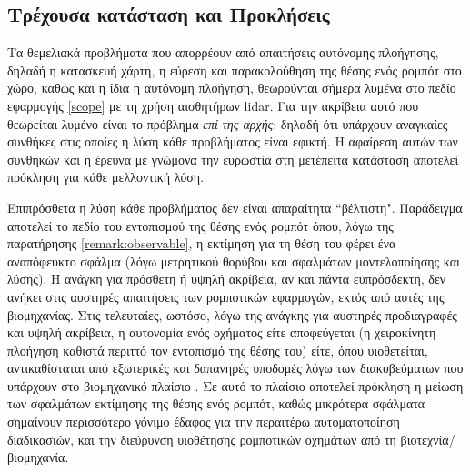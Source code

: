 

\subsection{Τρέχουσα κατάσταση και Προκλήσεις}

Τα θεμελιακά προβλήματα που απορρέουν από απαιτήσεις αυτόνομης πλοήγησης,
δηλαδή η κατασκευή χάρτη, η εύρεση και παρακολούθηση της θέσης ενός ρομπότ στο
χώρο, καθώς και η ίδια η αυτόνομη πλοήγηση, θεωρούνται σήμερα λυμένα στο πεδίο
εφαρμογής \ref{scope} με τη χρήση αισθητήρων lidar. Για την ακρίβεια αυτό που
θεωρείται λυμένο είναι το πρόβλημα \textit{επί της αρχής}: δηλαδή ότι υπάρχουν
αναγκαίες συνθήκες στις οποίες η λύση κάθε προβλήματος είναι εφικτή.  Η
αφαίρεση αυτών των συνθηκών και η έρευνα με γνώμονα την ευρωστία στη μετέπειτα
κατάσταση αποτελεί πρόκληση για κάθε μελλοντική λύση.

Επιπρόσθετα η λύση κάθε προβλήματος δεν είναι απαραίτητα ``βέλτιστη".
Παράδειγμα αποτελεί το πεδίο του εντοπισμού της θέσης ενός ρομπότ όπου, λόγω
της παρατήρησης \ref{remark:observable}, η εκτίμηση για τη θέση του φέρει ένα
αναπόφευκτο σφάλμα (λόγω μετρητικού θορύβου και σφαλμάτων μοντελοποίησης και
λύσης).  H ανάγκη για πρόσθετη ή υψηλή ακρίβεια, αν και πάντα ευπρόσδεκτη, δεν
ανήκει στις αυστηρές απαιτήσεις των ρομποτικών εφαρμογών, εκτός από αυτές της
βιομηχανίας.  Στις τελευταίες, ωστόσο, λόγω της ανάγκης για αυστηρές
προδιαγραφές και υψηλή ακρίβεια, η αυτονομία ενός οχήματος είτε αποφεύγεται
(η χειροκίνητη πλοήγηση καθιστά περιττό τον εντοπισμό της θέσης του) είτε,
όπου υιοθετείται, αντικαθίσταται από εξωτερικές και δαπανηρές υποδομές λόγω των
διακυβεύματων που υπάρχουν στο βιομηχανικό πλαίσιο \cite{Vasiljevic2016a}. Σε
αυτό το πλαίσιο αποτελεί πρόκληση η μείωση των σφαλμάτων εκτίμησης της θέσης
ενός ρομπότ, καθώς μικρότερα σφάλματα σημαίνουν περισσότερο γόνιμο έδαφος για
την περαιτέρω αυτοματοποίηση διαδικασιών, και την διεύρυνση υιοθέτησης
ρομποτικών οχημάτων από τη βιοτεχνία/βιομηχανία.
